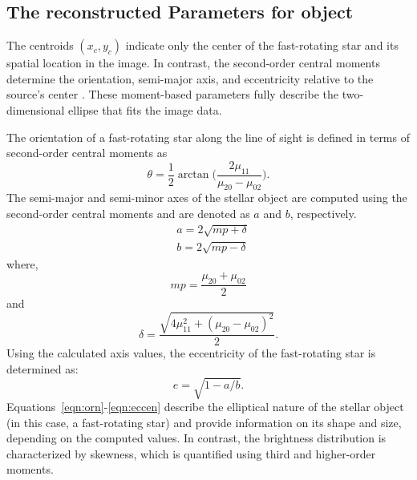 \subsection{The reconstructed Parameters for object}
The centroids \((x_c, y_c)\) indicate only the center of the fast-rotating star and its spatial location in the image. In contrast, the second-order central moments determine the orientation, semi-major axis, and eccentricity relative to the source's center \citep{teague1980image}. These moment-based parameters fully describe the two-dimensional ellipse that fits the image data.

The orientation of a fast-rotating star along the line of sight is defined in terms of second-order central moments as
\begin{equation}
	\theta = \frac{1}{2}\arctan \big(\frac{2\mu_{11}}{\mu_{20} - \mu_{02}}\big).
	\label{eqn:orn}
\end{equation}
The semi-major and semi-minor axes of the stellar object are computed using the second-order central moments and are denoted as \(a\) and \(b\), respectively.
\begin{equation}
	\begin{aligned}
		&a = 2\sqrt{mp + \delta} \\
		&b = 2\sqrt{mp - \delta}
	\end{aligned}
	\label{eqn:semi}
\end{equation}
where,
\begin{equation}
	mp = \frac{\mu_{20} + \mu_{02}}{2}
	\label{eqn:mp}
\end{equation}
and
\begin{equation}
	\delta = \frac{\sqrt{4\mu_{11}^2 + (\mu_{20} - \mu_{02})^2}}{2}.	
	\label{eqn:delta}
\end{equation}
Using the calculated axis values, the eccentricity of the fast-rotating star is determined as:
\begin{equation}
	e = \sqrt{1 - a/b}.
	\label{eqn:eccen}
\end{equation}
Equations~\ref{eqn:orn}-\ref{eqn:eccen} describe the elliptical nature of the stellar object (in this case, a fast-rotating star) and provide information on its shape and size, depending on the computed values. In contrast, the brightness distribution is characterized by skewness, which is quantified using third and higher-order moments.
